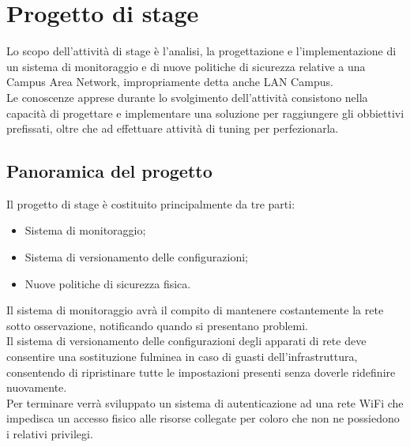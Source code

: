 \documentclass[Tesi.tex]{subfiles}
\begin{document}
\chapter{Progetto di stage}
Lo scopo dell'attività di stage è l’analisi, la progettazione e l'implementazione di un sistema di monitoraggio e di nuove politiche di sicurezza relative a una Campus Area Network, impropriamente detta anche LAN Campus. \\
Le conoscenze apprese durante lo svolgimento dell'attività consistono nella capacità di progettare e implementare una soluzione per raggiungere gli obbiettivi prefissati, oltre che ad effettuare attività di tuning per perfezionarla.


\section{Panoramica del progetto}

Il progetto di stage è costituito principalmente da tre parti:
\begin{itemize}
	\item Sistema di monitoraggio;
	\item Sistema di versionamento delle configurazioni;
	\item Nuove politiche di sicurezza fisica.
\end{itemize}

Il sistema di monitoraggio avrà il compito di mantenere costantemente la rete sotto osservazione, notificando quando si presentano problemi. \\
Il sistema di versionamento delle configurazioni degli apparati di rete deve consentire una sostituzione fulminea in caso di guasti dell'infrastruttura, consentendo di ripristinare tutte le impostazioni presenti senza doverle ridefinire nuovamente. \\
Per terminare verrà sviluppato un sistema di autenticazione ad una rete WiFi che impedisca un accesso fisico alle risorse collegate per coloro che non ne possiedono i relativi privilegi.\\
\end{document}
